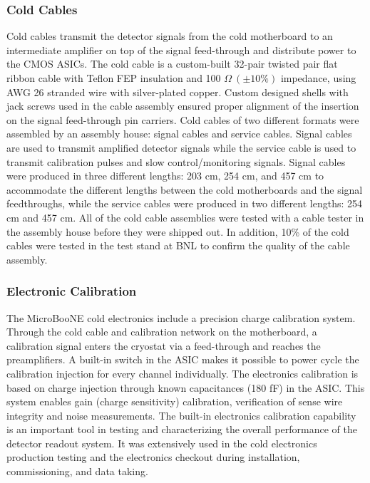 \subsubsection{Cold Cables}

Cold cables transmit the detector signals from the cold motherboard to an intermediate amplifier on top of the signal feed-through and distribute power to the CMOS ASICs. The cold cable is a custom-built 32-pair twisted pair flat ribbon cable with Teflon FEP insulation and 100 $\Omega~(\pm10\%)$ impedance, using AWG 26 stranded wire with silver-plated copper. Custom designed shells with jack screws used in the cable assembly ensured proper alignment of the insertion on the signal feed-through pin carriers.  Cold cables of two different formats were assembled by an assembly house: signal cables and service cables. Signal cables are used to transmit amplified detector signals while the service cable is used to transmit calibration pulses and slow control/monitoring signals. Signal cables were produced in three different lengths: 203 cm, 254 cm, and 457 cm to accommodate the different lengths between the cold motherboards and the signal feedthroughs, while the service cables were produced in two different lengths: 254 cm and 457 cm. All of the cold cable assemblies were tested with a cable tester in the assembly house before they were shipped out. In addition, 10\% of the cold cables were tested in the test stand at BNL to confirm the quality of the cable assembly. 

\subsubsection{Electronic Calibration}

The MicroBooNE cold electronics include a precision charge calibration system. Through the cold cable and calibration network on the motherboard, a calibration signal enters the cryostat via a feed-through and reaches the preamplifiers. A built-in switch in the ASIC makes it possible to power cycle the calibration injection for every channel individually. The electronics calibration is based on charge injection through known capacitances (180 fF) in the ASIC. This system enables gain (charge sensitivity) calibration, verification of sense wire integrity and noise measurements. The built-in electronics calibration capability is an important tool in testing and characterizing the overall performance of the detector readout system. It was extensively used in the cold electronics production testing and the electronics checkout during installation, commissioning, and data taking.
 
